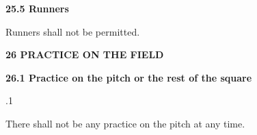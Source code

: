 \documentclass[12pt]{article}
\begin{document}
\vspace{\baselineskip}
{\fontsize{11pt}{13.2pt}\selectfont \textbf{25.5 \tabto{0.47in} Runners}\par}\par


\vspace{\baselineskip}
{\fontsize{9pt}{10.8pt}\selectfont Runners shall not be permitted.\par}\par


\vspace{\baselineskip}

\vspace{\baselineskip}

\vspace{\baselineskip}

\vspace{\baselineskip}

\vspace{\baselineskip}

\vspace{\baselineskip}

\vspace{\baselineskip}

\vspace{\baselineskip}

\vspace{\baselineskip}
\begin{Center}
{\fontsize{8pt}{9.6pt}\par}
\end{Center}\par


\vspace{\baselineskip}
{\fontsize{16pt}{19.2pt}\selectfont \textbf{26 PRACTICE ON THE FIELD}\par}\par


\vspace{\baselineskip}
{\fontsize{11pt}{13.2pt}\selectfont \textbf{26.1 \tabto{0.47in} Practice on the pitch or the rest of the square}\par}\par


\vspace{\baselineskip}
{\fontsize{9pt}{10.8pt}.1 \tabto{0.49in} {\fontsize{8pt}{9.6pt}\selectfont There shall not be any practice on the pitch at any time.\par}\par}\par
\end{document}

